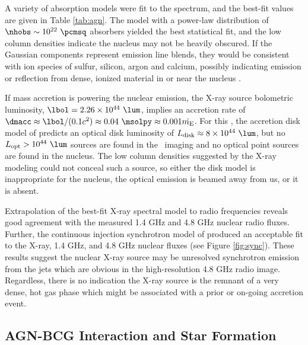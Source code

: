 \documentclass[11pt, preprint]{aastex}
\begin{document}
A variety of absorption models were fit to the spectrum, and the
best-fit values are given in Table \ref{tab:agn}. The model with a
power-law distribution of $\nhobs \sim 10^{22} ~\pcmsq$ absorbers
yielded the best statistical fit, and the low column densities
indicate the nucleus may not be heavily obscured. If the Gaussian
components represent emission line blends, they would be consistent
with ion species of sulfur, silicon, argon and calcium, possibly
indicating emission or reflection from dense, ionized material in or
near the nucleus \citep[\eg][]{1990ApJ...362...90B,
  1998MNRAS.297.1219I}.

If mass accretion is powering the nuclear emission, the X-ray source
bolometric luminosity, $\lbol = 2.26 \times 10^{44} ~\lum$, implies an
accretion rate of $\dmacc \approx \lbol/(0.1 c^2) \approx 0.04
~\msolpy \approx 0.001 \dme$. For this \dmacc, the accretion disk
model of \citet{2002NewAR..46..247M} predicts an optical disk
luminosity of $\ldisk \approx 8 \times 10^{44} ~\lum$, but no
$L_{\rm{opt}} > 10^{44} ~\lum$ sources are found in the \hst\ imaging
and no optical point sources are found in the nucleus. The low column
densities suggested by the X-ray modeling could not conceal such a
source, so either the disk model is inappropriate for the nucleus, the
optical emission is beamed away from us, or it is absent.

Extrapolation of the best-fit X-ray spectral model to radio
frequencies reveals good agreement with the measured 1.4 GHz and 4.8
GHz nuclear radio fluxes. Further, the continuous injection
synchrotron model of \citet{1987MNRAS.225..335H} produced an
acceptable fit to the X-ray, 1.4 GHz, and 4.8 GHz nuclear fluxes (see
Figure \ref{fig:sync}). These results suggest the nuclear X-ray source
may be unresolved synchrotron emission from the jets which are obvious
in the high-resolution 4.8 GHz radio image. Regardless, there is no
indication the X-ray source is the remnant of a very dense, hot gas
phase which might be associated with a prior or on-going accretion
event.

\subsection{AGN-BCG Interaction and Star Formation}
\label{sec:bcg}
\end{document}
